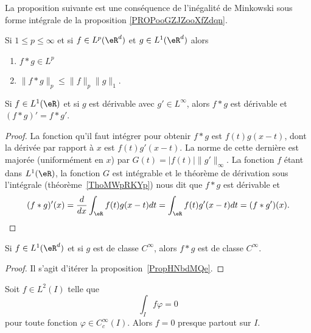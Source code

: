 La proposition suivante est une conséquence de l'inégalité de Minkowski sous forme intégrale de la proposition \ref{PROPooGZJZooXfZdqn}.
\begin{proposition}     \label{PROPooDMMCooPTuQuS}
	Si \( 1\leq p\leq \infty\) et si \( f\in L^p(\eR^d)\) et \( g\in L^1(\eR^d)\) alors
	\begin{enumerate}
		\item
		      \( f*g\in L^p\)
		\item
		      \( \| f*g \|_p\leq \| f \|_p\| g \|_1\).
	\end{enumerate}
\end{proposition}

\begin{proposition} \label{PropHNbdMQe}
	Si \( f\in L^1(\eR)\) et si \( g\) est dérivable avec \( g'\in L^{\infty}\), alors \( f*g\) est dérivable et \( (f*g)'=f*g'\).
\end{proposition}

\begin{proof}
	La fonction qu'il faut intégrer pour obtenir \( f*g\) est \( f(t)g(x-t)\), dont la dérivée par rapport à \( x\) est \( f(t)g'(x-t)\). La norme de cette dernière est majorée (uniformément en \( x\)) par \( G(t)=| f(t) | \| g' \|_{\infty}\). La fonction \( f\) étant dans \( L^1(\eR)\), la fonction \( G\) est intégrable et le théorème de dérivation sous l'intégrale (théorème~\ref{ThoMWpRKYp}) nous dit que \( f*g\) est dérivable et
	\begin{equation}
		(f*g)'(x)=\frac{ d }{ dx }\int_{\eR}f(t)g(x-t)dt=\int_{\eR}f(t)g'(x-t)dt=(f*g')(x).
	\end{equation}
\end{proof}

\begin{corollary}       \label{CORooBSPNooFwYQrc}
	Si \( f\in L^1(\eR^d)\) et si \( g\) est de classe \(  C^{\infty}\), alors \( f*g\) est de classe \(  C^{\infty}\).
\end{corollary}

\begin{proof}
	Il s'agit d'itérer la proposition~\ref{PropHNbdMQe}.
\end{proof}

\begin{lemma}       \label{LemDQEKNNf}
	Soit \( f\in L^2(I)\) telle que
	\begin{equation}
		\int_If\varphi=0
	\end{equation}
	pour toute fonction \( \varphi\in C^{\infty}_c(I)\). Alors \( f=0\) presque partout sur \( I\).
\end{lemma}

